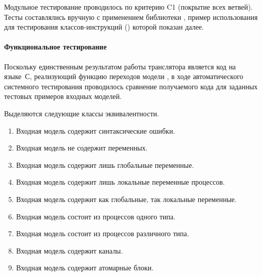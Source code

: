 Модульное тестирование проводилось по критерию C1 (покрытие всех ветвей). Тесты
составлялись вручную с применением библиотеки , пример использования для
тестирования классов-инструкций () которой показан далее.



\paragraph{Функциональное тестирование}

Поскольку единственным результатом работы транслятора является код на языке~С, реализующий
функцию переходов модели , в ходе автоматического системного тестирования
проводилось сравнение получаемого кода для заданных тестовых примеров входных моделей.

Выделяются следующие классы эквивалентности.
\begin{enumerate}
\item Входная модель содержит синтаксические ошибки.
\item Входная модель не содержит переменных.
\item Входная модель содержит лишь глобальные переменные.
\item Входная модель содержит лишь локальные переменные процессов.
\item Входная модель содержит как глобальные, так локальные переменные.
\item Входная модель состоит из процессов одного типа.
\item Входная модель состоит из процессов различного типа.
\item Входная модель содержит каналы.
\item Входная модель содержит атомарные блоки.
\end{enumerate}

